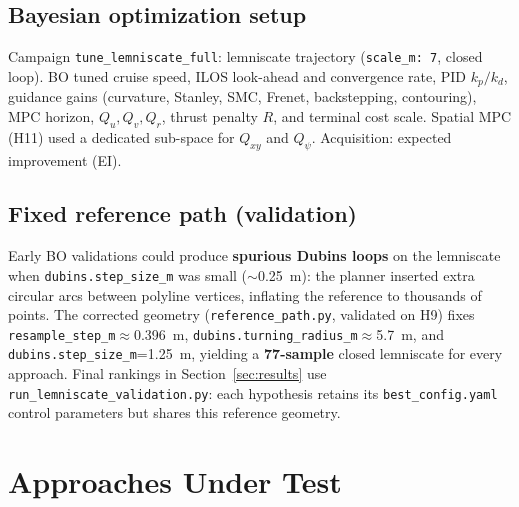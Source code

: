 \documentclass[11pt,a4paper]{article}
\begin{document}
\subsection{Bayesian optimization setup}

Campaign \texttt{tune\_lemniscate\_full}: lemniscate trajectory
(\texttt{scale\_m: 7}, closed loop). BO tuned cruise speed, ILOS look-ahead and convergence
rate, PID $k_p/k_d$, guidance gains (curvature, Stanley, SMC, Frenet, backstepping,
contouring), MPC horizon, $Q_u,Q_v,Q_r$, thrust penalty $R$, and terminal cost scale.
Spatial MPC (H11) used a dedicated sub-space for $Q_{xy}$ and $Q_\psi$.
Acquisition: expected improvement (EI).

\subsection{Fixed reference path (validation)}

Early BO validations could produce \textbf{spurious Dubins loops} on the lemniscate when
\texttt{dubins.step\_size\_m} was small ($\sim$\SI{0.25}{\meter}): the planner inserted
extra circular arcs between polyline vertices, inflating the reference to thousands of points.
The corrected geometry (\texttt{reference\_path.py}, validated on H9) fixes
\texttt{resample\_step\_m}$\approx$\SI{0.396}{\meter},
\texttt{dubins.turning\_radius\_m}$\approx$\SI{5.7}{\meter}, and
\texttt{dubins.step\_size\_m}=\SI{1.25}{\meter}, yielding a \textbf{77-sample} closed
lemniscate for every approach. Final rankings in Section~\ref{sec:results} use
\texttt{run\_lemniscate\_validation.py}: each hypothesis retains its
\texttt{best\_config.yaml} control parameters but shares this reference geometry.

\section{Approaches Under Test}
\label{sec:approaches}
\end{document}
